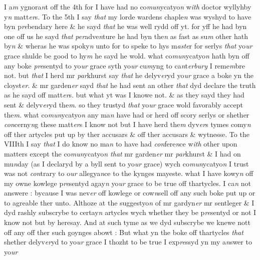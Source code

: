 \documentclass[12pt, a4paper]{book}
\begin{document}
			 I a\textit{m} ygnora\textit{n}t off the 4th for I have had no co\textit{mun}ycatyo\textit{n} w\textit{ith} doctor wyllyhby y\textit{n} matt\textit{er}s.   
				\marginpar[\vspace{0.5cm}{\textcolor{Gray}{5}}]{}
			 To the 5th I say \textit{that} my lorde wardens chaple\textit{n} was wyshyd to have byn p\textit{re}bendary here \& he sayd \textit{that} he was well rydd off yt. for yff he had byn one off us he sayd \textit{that}
               \textit{per}adve\textit{n}ture he had byn the\textit{n} as fast as su\textit{m} other hath by\textit{n} \& wheras he was spoky\textit{n} unto  for to speke to hys m\textit{aste}r for serlys \textit{that} yo\textit{ur} grace shulde be good to hy\textit{m} he sayd he wold.  
				\marginpar[\vspace{0.5cm}{\textcolor{Gray}{6}}]{}
			 what co\textit{mun}ycatyo\textit{n} hath byn off any boke \textit{pre}sentyd to yo\textit{ur} grace syth yo\textit{ur} cu\textit{m}yng to ca\textit{n}t\textit{erbury} I reme\textit{m}bre not. but \textit{that} I herd mr \textit{par}khurst say \textit{that} he delyv\textit{er}yd yo\textit{ur} grace a boke yn the cloyst\textit{er}. \& mr garden\textit{er} sayd \textit{that} he had sent an other \textit{that} dyd declare the truth as he sayd off matt\textit{er}s. but what yt was I knowe not. \& as they sayd they had sent  \& delyv\textit{er}yd the\textit{m}. so they trustyd \textit{that} yo\textit{ur} grace wold favorably accept the\textit{m}.   
				\marginpar[\vspace{0.5cm}{\textcolor{Gray}{7}}]{}
			 what co\textit{mun}ycatyo\textit{n} any ma\textit{n} have had or herd off scory serlys or shether \textit{con}cerny\textit{n}g these matt\textit{er}s  I know not but I have herd the\textit{m} dyv\textit{er}s tymes comy\textit{n} off ther artycles put up by ther  accusars \& off ther accusars \& wytnesse.  
				\marginpar[\vspace{0.5cm}{\textcolor{Gray}{8}}]{}
			 To the VIIIth I say \textit{that} I do know no ma\textit{n} to have had \textit{con}fere\textit{n}ce w\textit{ith} other upon matters except the co\textit{mun}ycatyo\textit{n that} mr garden\textit{er} mr \textit{par}khurst \& I had on mu\textit{n}day (as I declaryd by a byll sent to yo\textit{ur} grace) wych co\textit{mun}ycatyo\textit{n} I trust was not \textit{con}trary to  o\textit{ur} allegya\textit{n}ce to the kynges mayeste.  
				\marginpar[\vspace{0.5cm}{\textcolor{Gray}{9}}]{}
			 what I have kowy\textit{n} off my owne kowlege p\textit{re}sentyd agay\textit{n} yo\textit{ur} grace to be true off thartycles. I ca\textit{n} not answere : bycause I was nev\textit{er} off kowlege or cow\textit{n}sell off  any such boke put up or to agreable ther unto. Althoze at the suggestyo\textit{n} of mr gardyn\textit{er} mr sentleger \& I dyd rashly subscrybe to certay\textit{n} artycles wych whether they be p\textit{re}sentyd or not I know not but by heresay. And at such tyme as we dyd subscrybe we knewe nott off any off ther such goynges abowt : But what yn the boke off thartycles \textit{that} shether delyv\textit{er}yd to yo\textit{ur} grace I thozht to be true I exp\textit{re}ssyd yn my a\textit{n}swer to yo\textit{ur}
\end{document}
